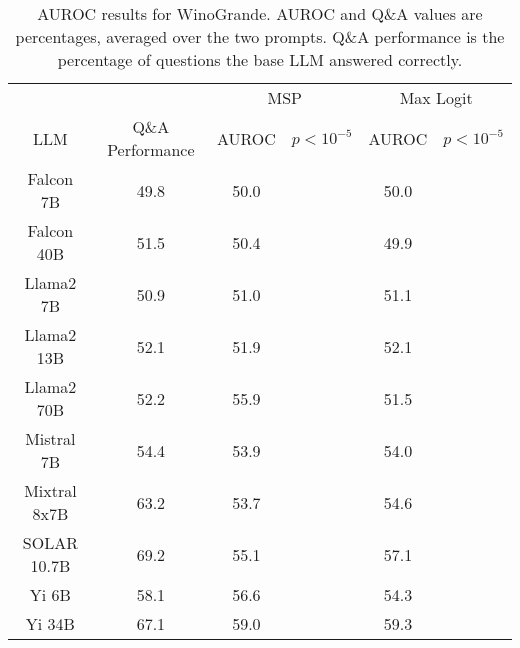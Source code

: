 \begin{table*}
\centering
\begin{tabular}{c|c|c|c|c|c}
& & \multicolumn{2}{c|}{MSP} & \multicolumn{2}{c}{Max Logit} \\ 
LLM & Q\&A Performance & AUROC & $p < 10^{-5}$ & AUROC & $p < 10^{-5}$\\ \hline
Falcon 7B & 49.8 & 50.0 &  & 50.0 & \\
Falcon 40B & 51.5 & 50.4 &  & 49.9 & \\
Llama2 7B & 50.9 & 51.0 &  & 51.1 & \\
Llama2 13B & 52.1 & 51.9 &  & 52.1 & \\
Llama2 70B & 52.2 & 55.9 &  & 51.5 & \\
Mistral 7B & 54.4 & 53.9 &  & 54.0 & \\
Mixtral 8x7B & 63.2 & 53.7 &  & 54.6 & \\
SOLAR 10.7B & 69.2 & 55.1 &  & 57.1 & \\
Yi 6B & 58.1 & 56.6 &  & 54.3 & \\
Yi 34B & 67.1 & 59.0 &  & 59.3 & \\
\hline
\end{tabular}
\caption{AUROC results for WinoGrande. AUROC and Q\&A values are percentages, averaged over the two prompts. Q\&A performance is the percentage of questions the base LLM answered correctly.}
\label{tab:winogrande_auroc}
\end{table*}
